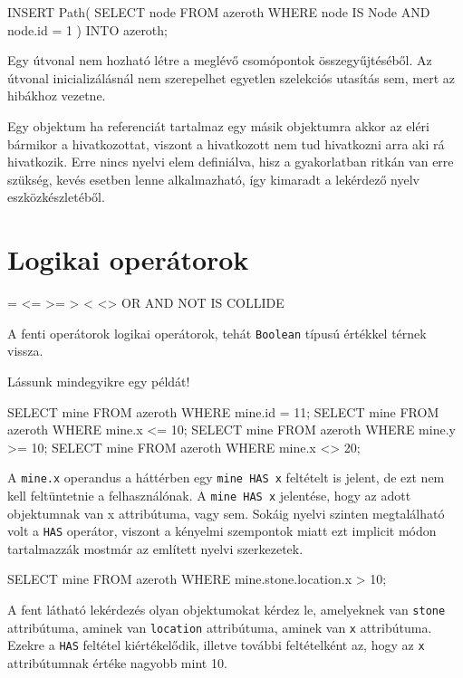 \begin{sql}
INSERT Path(
    SELECT node FROM azeroth
    WHERE node IS Node AND node.id = 1
) INTO azeroth;
\end{sql}

Egy útvonal nem hozható létre a meglévő csomópontok összegyűjtéséből. Az útvonal inicializálásnál nem szerepelhet egyetlen szelekciós utasítás sem, mert az hibákhoz vezetne.

Egy objektum ha referenciát tartalmaz egy másik objektumra akkor az eléri bármikor a hivatkozottat, viszont a hivatkozott nem tud hivatkozni arra aki rá hivatkozik. Erre nincs nyelvi elem definiálva, hisz a gyakorlatban ritkán van erre szükség, kevés esetben lenne alkalmazható, így kimaradt a lekérdező nyelv eszközkészletéből.

\section{Logikai operátorok}

\begin{sql}
=  <=  >=  >  <  <>
OR  AND  NOT  IS  COLLIDE
\end{sql}

A fenti operátorok logikai operátorok, tehát \texttt{Boolean} típusú értékkel térnek vissza.

Lássunk mindegyikre egy példát!

\begin{sql}
SELECT mine FROM azeroth WHERE mine.id = 11;
SELECT mine FROM azeroth WHERE mine.x <= 10;
SELECT mine FROM azeroth WHERE mine.y >= 10;
SELECT mine FROM azeroth WHERE mine.x <> 20;
\end{sql}

A \texttt{mine.x} operandus a háttérben egy \texttt{mine HAS x} feltételt is jelent, de ezt nem kell feltüntetnie a felhasználónak. A \texttt{mine HAS x} jelentése, hogy az adott objektumnak van x attribútuma, vagy sem. Sokáig nyelvi szinten megtalálható volt a \texttt{HAS} operátor, viszont a kényelmi szempontok miatt ezt implicit módon tartalmazzák mostmár az említett nyelvi szerkezetek.
 
\begin{sql}
SELECT mine FROM azeroth WHERE mine.stone.location.x > 10;
\end{sql}

A fent látható lekérdezés olyan objektumokat kérdez le, amelyeknek van \texttt{stone} attribútuma, aminek van \texttt{location} attribútuma, aminek van \texttt{x} attribútuma. Ezekre a \texttt{HAS} feltétel kiértékelődik, illetve további feltételként az, hogy az \texttt{x} attribútumnak értéke nagyobb mint 10.

